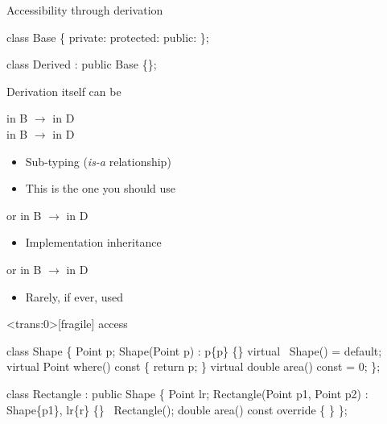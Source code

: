 \begin{frame}[fragile]{Accessibility through derivation}

  \begin{codeblock}{
class Base \{
 private:
  \ddd
 protected:
  \ddd
 public:
  \ddd
\};

class Derived : \alert{public} Base \{\};
}\end{codeblock}

  Derivation itself can be
  \begin{description}
    \item []  in B $\rightarrow$  in D\\
       in B $\rightarrow$  in D
      \begin{itemize}
      \item Sub-typing (\textit{is-a} relationship)
      \item This is the one you should use
      \end{itemize}
    \item<2-> [\code{private}]  or  in B
      $\rightarrow$  in D
      \begin{itemize}
      \item Implementation inheritance
      \end{itemize}
    \item<3-> [\code{protected}]  or  in B
      $\rightarrow$  in D
      \begin{itemize}
      \item Rarely, if ever, used
      \end{itemize}
  \end{description}
\end{frame}

\begin{frame}<trans:0>[fragile]{ access}
  \begin{codeblock}
class Shape \{
  Point p;
  Shape(Point p) : p\{p\} \{\}
  virtual ~Shape() = default;
  virtual Point \alert<6>{where}() const \{ return p; \}
  virtual double area() const = 0;
\};

class Rectangle : \alert<1>{public} Shape \{
  Point lr;
  Rectangle(Point p1, Point p2) : Shape\{p1\}, lr\{r\} \{\}
  ~Rectangle();
  double area() const override \{ \ddd {} \ddd \}
\};\end{codeblock}


\end{frame}

